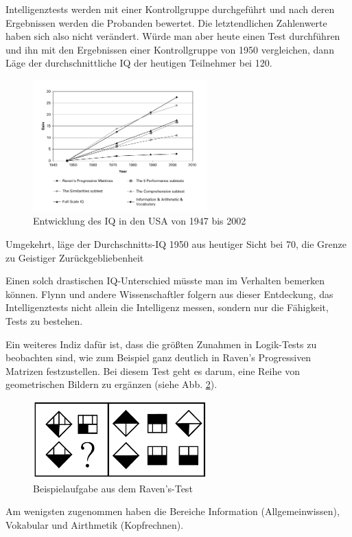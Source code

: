 Intelligenztests werden mit einer Kontrollgruppe durchgeführt und nach deren Ergebnissen werden die Probanden bewertet. Die letztendlichen Zahlenwerte haben sich also nicht verändert. Würde man aber heute einen Test durchführen und ihn mit den Ergebnissen einer Kontrollgruppe von 1950 vergleichen, dann Läge der durchschnittliche IQ der heutigen Teilnehmer bei 120.

\begin{figure}
  \centering
  \includegraphics[width=0.6\textwidth]{img/Flynn.png}
  \caption{Entwicklung des IQ in den USA von 1947 bis 2002 \cite{flynn}}
  \label{fig:flynn}
\end{figure}

Umgekehrt, läge der Durchschnitts-IQ 1950 aus heutiger Sicht bei 70, die Grenze zu \glqq Geistiger Zurückgebliebenheit\grqq{}
\cite{ted_flynn}

Einen solch drastischen IQ-Unterschied müsste man im Verhalten bemerken können. Flynn und andere Wissenschaftler folgern aus dieser Entdeckung, das Intelligenztests nicht allein die Intelligenz messen, sondern nur die Fähigkeit, Tests zu bestehen.

Ein weiteres Indiz dafür ist, dass die größten Zunahmen in Logik-Tests zu beobachten sind, wie zum Beispiel ganz deutlich in \glqq Raven's Progressiven Matrizen \grqq{} festzustellen. Bei diesem Test geht es darum, eine Reihe von geometrischen Bildern zu ergänzen (siehe Abb. \ref{fig:ravens}).

\begin{figure}
  \centering
  \includegraphics[width=0.6\textwidth]{img/ravens.png}
  \caption{Beispielaufgabe aus dem Raven's-Test \cite{flynn}}
  \label{fig:ravens}
\end{figure}

Am wenigsten zugenommen haben die Bereiche Information (Allgemeinwissen), Vokabular und Airthmetik (Kopfrechnen).
